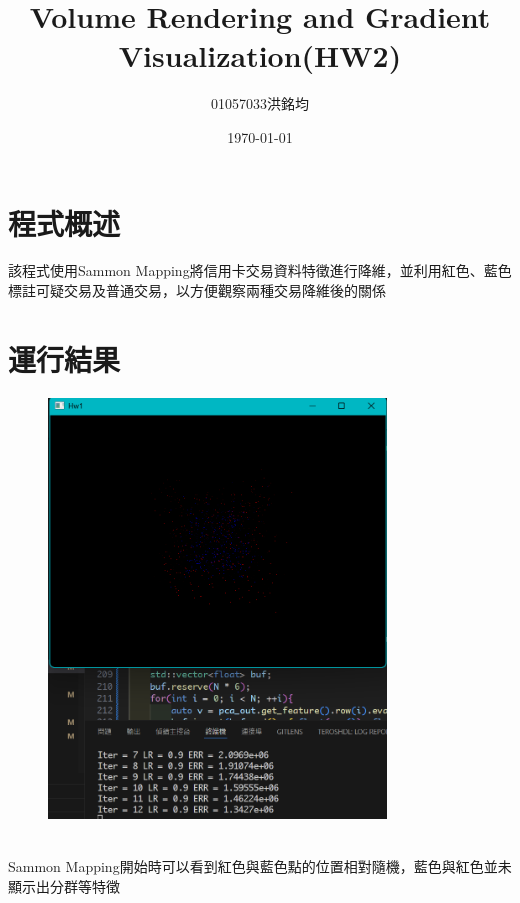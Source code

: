 \documentclass[a4paper,12pt]{article}
\title{Volume Rendering and Gradient Visualization(HW2)}
\author{01057033洪銘均}
\date{\today}
\begin{document}
\maketitle
\tableofcontents
\newpage

\section{程式概述}
該程式使用Sammon Mapping將信用卡交易資料特徵進行降維，並利用紅色、藍色標註可疑交易及普通交易，以方便觀察兩種交易降維後的關係


\section{運行結果}

\begin{figure}[H]
    \centering
    \includegraphics[width=0.8\textwidth]{img/img2.png}
\end{figure}\\
Sammon Mapping開始時可以看到紅色與藍色點的位置相對隨機，藍色與紅色並未顯示出分群等特徵
\end{document}
